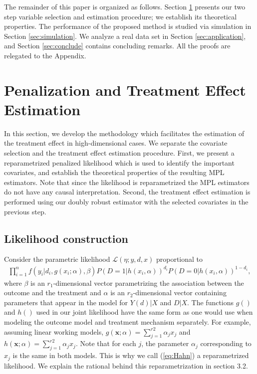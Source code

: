 \documentclass[11pt]{statsoc}
\begin{document}
The remainder of this paper is organized as follows. Section \ref{sec:penalized} presents our two step variable selection and estimation procedure; we establish its theoretical properties.  The performance of the proposed method is studied via simulation in Section \ref{sec:simulation}. We analyze a real data set in Section \ref{sec:application}, and Section \ref{sec:conclude} contains concluding
remarks.  All the proofs are relegated to the Appendix.

\section{Penalization and Treatment Effect Estimation} \label{sec:penalized}

In this section, we develop the methodology which facilitates the estimation of the treatment effect in high-dimensional cases.  We separate the covariate selection and the treatment effect estimation procedure. First, we present a reparametrized penalized likelihood which is used to identify the important covariates, and establish the theoretical properties of the resulting MPL estimators. Note that since the likelihood is reparametrized the MPL estimators do not have any causal interpretation. Second, the treatment effect estimation is performed using our doubly robust estimator with the selected covariates in the previous step. 

\subsection{Likelihood construction}

Consider the parametric likelihood ${\mathcal{L}}(\eta;y,d,x)$ proportional to
\begin{align}
\prod_{i=1}^n  f(y_i|d_i,g(x_i;\alpha), \beta ) P(D=1|h(x_i,\alpha))  ^{d_i}
P(D=0|h(x_i,\alpha))^{1-d_i},
\label{eq:Hahn}
\end{align}
where $\beta$ is an $r_1$-dimensional vector parametrizing the association between the outcome and the treatment and $\alpha$ is an $r_2$-dimensional vector containing parameters that appear in the model for $Y(d)|X$ and $D|X$. The functions $g()$ and $h()$ used in our joint likelihood have the same form as one would use when modeling the outcome model and treatment mechanism separately. For example, assuming  linear working models, $g({\bm{x}};\alpha)=\sum_{j=1}^{r2} \alpha_j x_j$ and $h({\bm{x}};\alpha)=\sum_{j=1}^{r2} \alpha_j x_j$. Note that for each $j$, the parameter $\alpha_j$ corresponding to $x_j$ is the same in both models. This is why we call (\ref{eq:Hahn}) a reparametrized likelihood. We explain the rational behind this reparametrization in section 3.2. 
\end{document}
